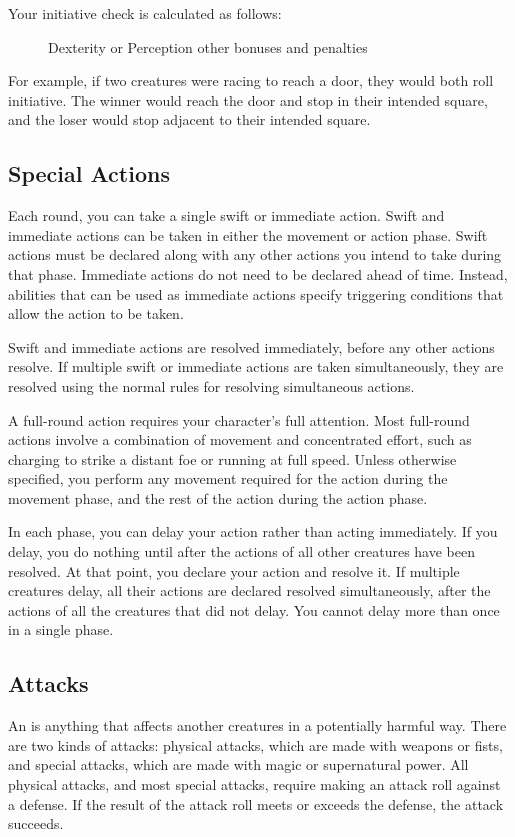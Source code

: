 Your initiative check is calculated as follows:

\begin{figure}[h]
    \centering Dexterity or Perception  \add other bonuses and penalties
\end{figure}

For example, if two creatures were racing to reach a door, they would both roll initiative. The winner would reach the door and stop in their intended square, and the loser would stop adjacent to their intended square. 

\subsection{Special Actions}

\label{Swift and Immediate Actions} Each round, you can take a single swift or immediate action. Swift and immediate actions can be taken in either the movement or action phase. Swift actions must be declared along with any other actions you intend to take during that phase. Immediate actions do not need to be declared ahead of time. Instead, abilities that can be used as immediate actions specify triggering conditions that allow the action to be taken.

Swift and immediate actions are resolved immediately, before any other actions resolve. If multiple swift or immediate actions are taken simultaneously, they are resolved using the normal rules for resolving simultaneous actions.

 A full-round action requires your character's full attention. Most full-round actions involve a combination of movement and concentrated effort, such as charging to strike a distant foe or running at full speed. Unless otherwise specified, you perform any movement required for the action during the movement phase, and the rest of the action during the action phase.

\label{Delaying}
In each phase, you can delay your action rather than acting immediately. If you delay, you do nothing until after the actions of all other creatures have been resolved. At that point, you declare your action and resolve it. If multiple creatures delay, all their actions are declared resolved simultaneously, after the actions of all the creatures that did not delay. You cannot delay more than once in a single phase.

\subsection{Attacks}\label{Attacks}
An  is anything that affects another creatures in a potentially harmful way. There are two kinds of attacks: physical attacks, which are made with weapons or fists, and special attacks, which are made with magic or supernatural power. All physical attacks, and most special attacks, require making an attack roll against a defense. If the result of the attack roll meets or exceeds the defense, the attack succeeds.

